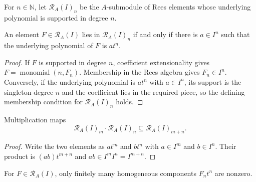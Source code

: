 \begin{definition}
  \label{def:nagata-rees-piece}
  \leanok

  For $n\in\mathbb N$, let $\mathcal R_A(I)_n$ be the $A$-submodule of Rees
  elements whose underlying polynomial is supported in degree $n$.
\end{definition}

\begin{lemma}
  \label{lemma:nagata-rees-piece-membership}
  \leanok

  An element $F\in\mathcal R_A(I)$ lies in $\mathcal R_A(I)_n$ if and only if
  there is $a\in I^n$ such that the underlying polynomial of $F$ is
  $at^n$.
\end{lemma}

\begin{proof}
  \leanok
  If $F$ is supported in degree $n$, coefficient extensionality gives
  $F=\operatorname{monomial}(n,F_n)$.  Membership in the Rees algebra gives
  $F_n\in I^n$.  Conversely, if the underlying polynomial is $at^n$ with $a\in I^n$, its
  support is the singleton degree $n$ and the coefficient lies in the required
  piece, so the defining membership condition for
  $\mathcal R_A(I)_n$ holds.
\end{proof}

\begin{lemma}
  \label{lemma:nagata-rees-piece-mul}
  \leanok

  Multiplication maps
  \[
    \mathcal R_A(I)_m\cdot\mathcal R_A(I)_n
      \subseteq\mathcal R_A(I)_{m+n}.
  \]
\end{lemma}

\begin{proof}
  \leanok
  Write the two elements as $at^m$ and $bt^n$ with $a\in I^m$ and
  $b\in I^n$.  Their product is $(ab)t^{m+n}$ and
  $ab\in I^mI^n=I^{m+n}$.
\end{proof}

\begin{lemma}
  \label{lemma:nagata-rees-component-finite-support}
  \leanok

  For $F\in\mathcal R_A(I)$, only finitely many homogeneous components
  $F_nt^n$ are nonzero.
\end{lemma}

